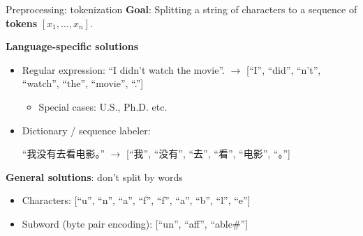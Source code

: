 \documentclass[usenames,dvipsnames,notes,11pt,aspectratio=169]{beamer}
\newcommand{\pdfnote}[1]{}
\begin{document}
\begin{frame}
    {Preprocessing: tokenization}
    \textbf{Goal}: Splitting a string of characters to a sequence of \textbf{tokens} $[x_1, \ldots, x_n]$.

    \medskip
    \textbf{Language-specific solutions}\\
    \begin{itemize}
        \itemsep1em
        \item Regular expression: ``I didn't watch the movie''. $\rightarrow$ [``I'', ``did'', ``n't'', ``watch'', ``the'', ``movie'', ``.''] 
            \begin{itemize}
                \item Special cases: U.S., Ph.D. etc.
            \end{itemize}
        \item Dictionary / sequence labeler: 
            \begin{CJK*}{UTF8}{gbsn}
                ``我没有去看电影。'' $\rightarrow$ [``我'', ``没有'', ``去'', ``看'', ``电影'', ``。'']
            \end{CJK*}
    \end{itemize}


    \medskip
    \pause
    \textbf{General solutions}: don't split by words\\
    \begin{itemize}[<+->]
        \item Characters:
            [``u'', ``n'', ``a'', ``f'', ``f'', ``a'', ``b'', ``l'', ``e''] 
        \item Subword (\eg byte pair encoding):
            [``un'', ``aff'', ``able\#'']
    \end{itemize}
    \pdfnote{
        Note that for contractions like didn't. We can tokenize it into either did n't or didn 't. Both are okay as long as it's consistent.
        English tokenization gets more complex when there is punctuations or special symbols.
    }
    \pdfnote{Tokenization can have important impact on the performance of downstream learning algorithms.
    }
    \pdfnote{
        Using character sequences (or even byte sequences) we impose mininal prior knowledge on what is a word. Given enough data, the model can probably figure out a reasonable unit of the characters based on their frequencies. But one downside in this approach is that the sequence is now much longer, and the computation time of many algorithms grows with sequence length, which will be expensive for large-scale training.
    }
    \pdfnote{
        A middle ground is to use subword, a unit larger than characters but smaller than words.
        This is commonly used in large-scale models nowadays.
        The BPE algorithms is a simple technique from data compression.
        The basic idea is to recursively merge frequently adjacent symbols into a new symbol (or token).
        The subword found through this algorithm often corresponds to morphemes.
    }
\end{frame}
\end{document}
